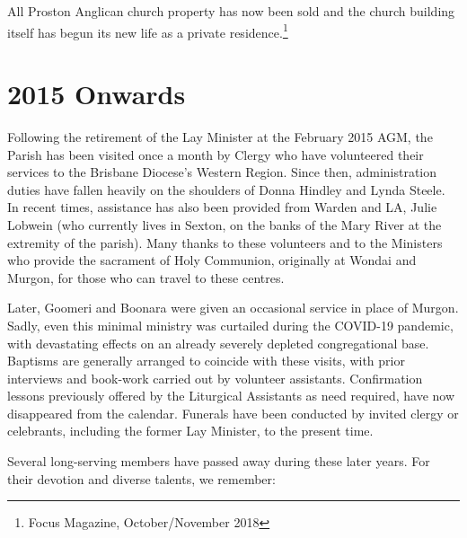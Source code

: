 All Proston Anglican church property has now been sold and the church building itself has begun its new life as a private residence.\footnote{Focus Magazine, October/November 2018}


\section{2015 Onwards}



Following the retirement of the Lay Minister at the February 2015 AGM, the Parish has been visited once a month by Clergy who have volunteered their services to the Brisbane Diocese's Western Region. Since then, administration duties have fallen heavily on the shoulders of Donna Hindley and Lynda Steele. In recent times, assistance has also been provided from Warden and LA, Julie Lobwein (who currently lives in Sexton, on the banks of the Mary River at the extremity of the parish). Many thanks to these volunteers and to the Ministers who provide the sacrament of Holy Communion, originally at Wondai and Murgon, for those who can travel to these centres.



Later, Goomeri and Boonara were given an occasional service in place of Murgon. Sadly, even this minimal ministry was curtailed during the COVID-19 pandemic, with devastating effects on an already severely depleted congregational base. Baptisms are generally arranged to coincide with these visits, with prior interviews and book-work carried out by volunteer assistants. Confirmation lessons previously offered by the Liturgical Assistants as need required, have now disappeared from the calendar. Funerals have been conducted by invited clergy or celebrants, including the former Lay Minister, to the present time.



Several long-serving members have passed away during these later years. For their devotion and diverse talents, we remember:



